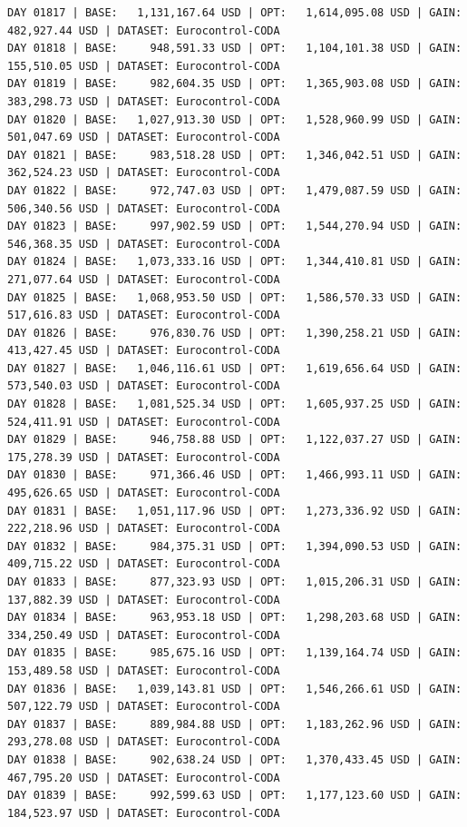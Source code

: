 \documentclass[11pt,a4paper]{article}
\begin{document}
\begin{verbatim}
DAY 01817 | BASE:   1,131,167.64 USD | OPT:   1,614,095.08 USD | GAIN: 482,927.44 USD | DATASET: Eurocontrol-CODA
DAY 01818 | BASE:     948,591.33 USD | OPT:   1,104,101.38 USD | GAIN: 155,510.05 USD | DATASET: Eurocontrol-CODA
DAY 01819 | BASE:     982,604.35 USD | OPT:   1,365,903.08 USD | GAIN: 383,298.73 USD | DATASET: Eurocontrol-CODA
DAY 01820 | BASE:   1,027,913.30 USD | OPT:   1,528,960.99 USD | GAIN: 501,047.69 USD | DATASET: Eurocontrol-CODA
DAY 01821 | BASE:     983,518.28 USD | OPT:   1,346,042.51 USD | GAIN: 362,524.23 USD | DATASET: Eurocontrol-CODA
DAY 01822 | BASE:     972,747.03 USD | OPT:   1,479,087.59 USD | GAIN: 506,340.56 USD | DATASET: Eurocontrol-CODA
DAY 01823 | BASE:     997,902.59 USD | OPT:   1,544,270.94 USD | GAIN: 546,368.35 USD | DATASET: Eurocontrol-CODA
DAY 01824 | BASE:   1,073,333.16 USD | OPT:   1,344,410.81 USD | GAIN: 271,077.64 USD | DATASET: Eurocontrol-CODA
DAY 01825 | BASE:   1,068,953.50 USD | OPT:   1,586,570.33 USD | GAIN: 517,616.83 USD | DATASET: Eurocontrol-CODA
DAY 01826 | BASE:     976,830.76 USD | OPT:   1,390,258.21 USD | GAIN: 413,427.45 USD | DATASET: Eurocontrol-CODA
DAY 01827 | BASE:   1,046,116.61 USD | OPT:   1,619,656.64 USD | GAIN: 573,540.03 USD | DATASET: Eurocontrol-CODA
DAY 01828 | BASE:   1,081,525.34 USD | OPT:   1,605,937.25 USD | GAIN: 524,411.91 USD | DATASET: Eurocontrol-CODA
DAY 01829 | BASE:     946,758.88 USD | OPT:   1,122,037.27 USD | GAIN: 175,278.39 USD | DATASET: Eurocontrol-CODA
DAY 01830 | BASE:     971,366.46 USD | OPT:   1,466,993.11 USD | GAIN: 495,626.65 USD | DATASET: Eurocontrol-CODA
DAY 01831 | BASE:   1,051,117.96 USD | OPT:   1,273,336.92 USD | GAIN: 222,218.96 USD | DATASET: Eurocontrol-CODA
DAY 01832 | BASE:     984,375.31 USD | OPT:   1,394,090.53 USD | GAIN: 409,715.22 USD | DATASET: Eurocontrol-CODA
DAY 01833 | BASE:     877,323.93 USD | OPT:   1,015,206.31 USD | GAIN: 137,882.39 USD | DATASET: Eurocontrol-CODA
DAY 01834 | BASE:     963,953.18 USD | OPT:   1,298,203.68 USD | GAIN: 334,250.49 USD | DATASET: Eurocontrol-CODA
DAY 01835 | BASE:     985,675.16 USD | OPT:   1,139,164.74 USD | GAIN: 153,489.58 USD | DATASET: Eurocontrol-CODA
DAY 01836 | BASE:   1,039,143.81 USD | OPT:   1,546,266.61 USD | GAIN: 507,122.79 USD | DATASET: Eurocontrol-CODA
DAY 01837 | BASE:     889,984.88 USD | OPT:   1,183,262.96 USD | GAIN: 293,278.08 USD | DATASET: Eurocontrol-CODA
DAY 01838 | BASE:     902,638.24 USD | OPT:   1,370,433.45 USD | GAIN: 467,795.20 USD | DATASET: Eurocontrol-CODA
DAY 01839 | BASE:     992,599.63 USD | OPT:   1,177,123.60 USD | GAIN: 184,523.97 USD | DATASET: Eurocontrol-CODA

\end{verbatim}
\end{document}
